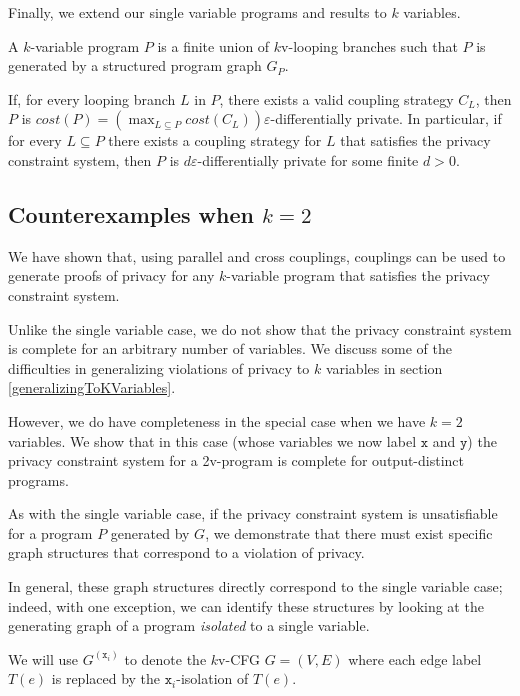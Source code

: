 Finally, we extend our single variable programs and results to $k$ variables.

\begin{defn}
    A $k$-variable program $P$ is a finite union of $k$v-looping branches such that $P$ is generated by a structured program graph $G_P$.
\end{defn}

\begin{lemma}
    If, for every looping branch $L$ in $P$, there exists a valid coupling strategy $C_L$, then $P$ is $cost(P) = (\max_{L\subseteq P} cost(C_L))\varepsilon$-differentially private. In particular, if for every $L\subseteq P$ there exists a coupling strategy for $L$ that satisfies the privacy constraint system, then $P$ is $d\varepsilon$-differentially private for some finite $d>0$.
\end{lemma}

\subsection{Counterexamples when $k=2$}

We have shown that, using parallel and cross couplings, couplings can be used to generate proofs of privacy for any $k$-variable program that satisfies the privacy constraint system. 

Unlike the single variable case, we do not show that the privacy constraint system is complete for an arbitrary number of variables. We discuss some of the difficulties in generalizing violations of privacy to $k$ variables in section \ref{generalizingToKVariables}.

However, we do have completeness in the special case when we have $k=2$ variables. We show that in this case (whose variables we now label $\texttt{x}$ and $\texttt{y}$) the privacy constraint system for a 2v-program is complete for output-distinct programs. 

As with the single variable case, if the privacy constraint system is unsatisfiable for a program $P$ generated by $G$, we demonstrate that there must exist specific graph structures that correspond to a violation of privacy.

In general, these graph structures directly correspond to the single variable case; indeed, with one exception, we can identify these structures by looking at the generating graph of a program \textit{isolated} to a single variable. 

We will use $G^{(\texttt{x}_i)}$ to denote the $k$v-CFG $G = (V, E)$ where each edge label $T(e)$ is replaced by the $\texttt{x}_i$-isolation of $T(e)$. 

